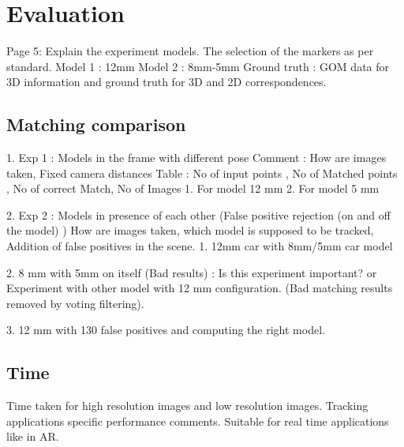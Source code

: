 \documentclass{bmvc2k}
\begin{document}

\section{Evaluation}
Page 5: 
Explain the experiment models. The selection of the markers as per standard. 
Model 1 : 12mm 
Model 2 : 8mm-5mm 
Ground truth : GOM data for 3D information and ground truth for 3D and 2D correspondences. 
\subsection{Matching comparison}
1. Exp 1 : Models in the frame with different pose 
Comment : How are images taken, Fixed camera distances 
Table : No of input points , No of Matched points , No of correct Match, No of Images
1. For model 12 mm 
2. For model 5 mm

2. Exp 2 : Models in presence of each other (False positive rejection (on and off the model) )
How are images taken, which model is supposed to be tracked, Addition of false positives in the scene. 
1. 12mm car with 8mm/5mm car model 

2. 8 mm with 5mm on itself (Bad results) : Is this experiment important? or Experiment with other model with 12 mm configuration. (Bad matching results removed by voting filtering). 

3. 12 mm with 130 false positives and computing the right model. 
\subsection{Time}
Time taken for high resolution images and low resolution images. Tracking applications specific performance comments. Suitable for real time applications like in AR. 
\end{document}

